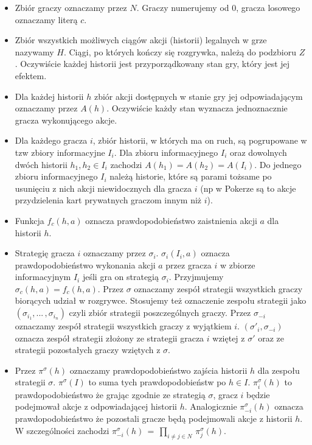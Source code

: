\documentclass[licencjacka]{pracamgr}
\begin{document}
\begin{itemize}

\item Zbiór graczy oznaczamy przez $N$. Graczy numerujemy od $0$, gracza losowego oznaczamy literą $c$.
\item Zbiór wszystkich możliwych ciągów akcji (historii) legalnych w grze nazywamy $H$. Ciągi, po których kończy
      się rozgrywka, należą do podzbioru $Z$. Oczywiście każdej historii jest przyporządkowany stan gry, który
      jest jej efektem.
\item Dla każdej historii $h$ zbiór akcji dostępnych w stanie gry jej odpowiadającym oznaczamy przez $A(h)$. Oczywiście
      każdy stan wyznacza jednoznacznie gracza wykonującego akcje.
\item Dla każdego gracza $i$, zbiór historii, w których ma on ruch, są pogrupowane w tzw zbiory informacyjne $I_i$. Dla zbioru
      informacyjnego $I_i$ oraz dowolnych dwóch historii $h_1, h_2 \in I_i$ zachodzi $A(h_1) = A(h_2) = A(I_i)$. Do jednego
      zbioru informacyjnego $I_i$ należą historie, które są parami tożsame po usunięciu z nich akcji niewidocznych dla gracza $i$
      (np w Pokerze są to akcje przydzielenia kart prywatnych graczom innym niż $i$).
\item Funkcja $f_c(h, a)$ oznacza prawdopodobieństwo zaistnienia akcji $a$ dla historii $h$.
\item Strategię gracza $i$ oznaczamy przez $\sigma_i$. $\sigma_i(I_i, a)$ oznacza prawdopodobieństwo wykonania akcji $a$ przez
      gracza $i$ w zbiorze informacyjnym $I_i$ jeśli gra on strategią $\sigma_i$. Przyjmujemy $\sigma_c(h, a) = f_c(h, a)$.
      Przez $\sigma$ oznaczamy zespół strategii wszystkich graczy biorących udział w rozgrywce. Stosujemy też oznaczenie
      zespołu strategii jako $(\sigma_{i_1}, ... \, , \sigma_{i_n})$ czyli zbiór strategii poszczególnych graczy. Przez $\sigma_{-i}$ oznaczamy
      zespół strategii wszystkich graczy z wyjątkiem $i$. $(\sigma'_i, \sigma_{-i})$ oznacza zespół strategii złożony ze strategii
      gracza $i$ wziętej z $\sigma'$ oraz ze strategii pozostałych graczy wziętych z $\sigma$.
\item Przez $\pi^{\sigma}(h)$ oznaczamy prawdopodobieństwo zajścia historii $h$ dla zespołu strategii $\sigma$.
      $\pi^{\sigma}(I)$ to suma tych prawdopodobieństw po $h \in I$. $\pi_i^{\sigma}(h)$ to prawdopodobieństwo że grając
      zgodnie ze strategią $\sigma$, gracz $i$ będzie podejmował akcje z odpowiadającej historii $h$. Analogicznie
      $\pi_{-i}^{\sigma}(h)$ oznacza prawdopodobieństwo że pozostali gracze będą podejmowali akcje z historii $h$. W szczególności
      zachodzi $\pi_{-i}^{\sigma}(h) \, = \, \prod\limits_{i \neq j \in N} \, \pi_j^{\sigma}(h)$.
\end{itemize}
\end{document}
